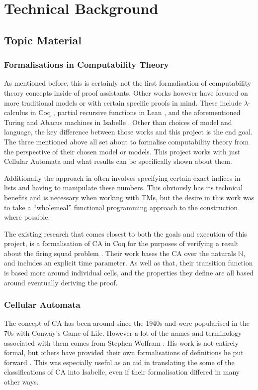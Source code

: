 \chapter{Technical Background}

\section{Topic Material}

\subsection{Formalisations in Computability Theory}

As mentioned before,
this is certainly not the first formalisation of computability theory concepts inside of proof assistants.
Other works however have focused on more traditional models or with certain specific proofs in mind.
These include $\lambda$-calculus in Coq \cite{forster},
partial recursive functions in Lean \cite{carneiro},
and the aforementioned Turing and Abacus machines in Isabelle \cite{urban}.
Other than choices of model and language,
the key difference between those works and this project is the end goal.
The three mentioned above all set about to formalise computability theory from the perspective of their chosen model or models.
This project works with just Cellular Automata and what results can be specifically shown about them.

Additionally the approach in \cite{urban} often involves specifying certain exact indices in lists and having to manipulate these numbers.
This obviously has its technical benefits and is necessary when working with TMs,
but the desire in this work was to take a ``wholemeal'' functional programming approach to the construction where possible.

The existing research that comes closest to both the goals and execution of this project,
is a formalisation of CA in Coq for the purposes of verifying a result about the firing squad problem \cite{firing}.
Their work bases the CA over the naturals $\mathbb{N}$,
and includes an explicit time parameter.
As well as that,
their transition function is based more around individual cells,
and the properties they define are all based around eventually deriving the proof.


\subsection{Cellular Automata}
The concept of CA has been around since the 1940s and were popularised in the 70s with Conway's Game of Life.
However a lot of the names and terminology associated with them comes from Stephen Wolfram \cite{wolfram}.
His work is not entirely formal,
but others have provided their own formalisations of definitions he put forward \cite{yu}.
This was especially useful as an aid in translating the some of the classifications of CA into Isabelle, 
even if their formalisation differed in many other ways.


